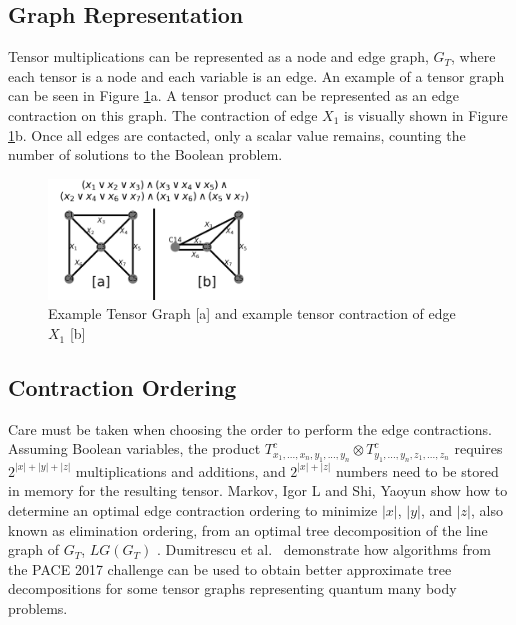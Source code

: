 \documentclass[12pt,twocolumn]{article}
\begin{document}
\hypertarget{graph-representation}{%
\subsection{Graph Representation}\label{graph-representation}}

Tensor multiplications can be represented as a node and edge graph, \(G_T\), where each tensor is a node and each variable is an edge. An example of a tensor graph can be seen in Figure \ref{fig:Tensor Graph Example}a. A tensor product can be represented as an edge contraction on this graph. The contraction of edge \(X_1\) is visually shown in Figure \ref{fig:Tensor Graph Example}b. Once all edges are contacted, only a scalar value remains, counting the number of solutions to the Boolean problem.

\begin{figure}[t]
\caption{Example Tensor Graph [a] and example tensor contraction of edge $X_1$ [b]}
\label{fig:Tensor Graph Example}
\includegraphics[width=0.5\textwidth]{../figures/TensorGraphExample.png}
\end{figure}

\hypertarget{contraction-ordering}{%
\subsection{Contraction Ordering}\label{contraction-ordering}}

Care must be taken when choosing the order to perform the edge contractions. Assuming Boolean variables, the product \(T^c_{x_1,...,x_n,y_1,...,y_n} \otimes T^c_{y_1,...,y_n,z_1,...,z_n}\) requires \(2^{|x|+|y|+|z|}\) multiplications and additions, and \(2^{|x|+|z|}\) numbers need to be stored in memory for the resulting tensor. Markov, Igor L and Shi, Yaoyun show how to determine an optimal edge contraction ordering to minimize \(|x|\), \(|y|\), and \(|z|\), also known as elimination ordering, from an optimal tree decomposition of the line graph of \(G_T\), \(LG(G_T)\) \cite{markov2008simulating}. Dumitrescu et al.~\cite{dumitrescu2018benchmarking} demonstrate how algorithms from the PACE 2017 challenge \cite{dell2018pace} can be used to obtain better approximate tree decompositions for some tensor graphs representing quantum many body problems.
\end{document}
